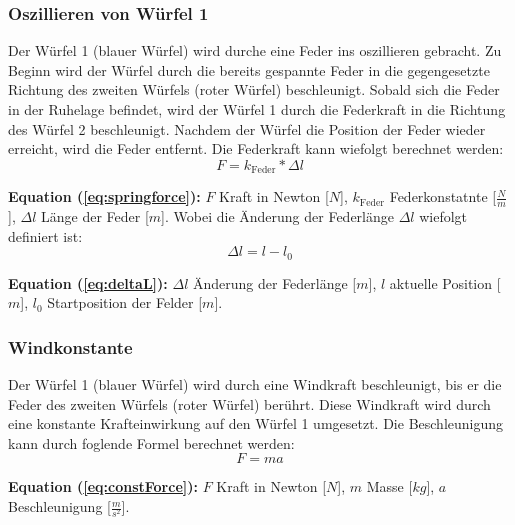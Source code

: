 \documentclass{article}
\begin{document}
\subsubsection{Oszillieren von Würfel 1}
Der Würfel 1 (blauer Würfel) wird durche eine Feder ins oszillieren gebracht. Zu Beginn wird der Würfel durch die bereits gespannte Feder in die gegengesetzte Richtung des zweiten Würfels (roter Würfel) beschleunigt. Sobald sich die Feder in der Ruhelage befindet, wird der Würfel 1 durch die Federkraft in die Richtung des Würfel 2 beschleunigt. Nachdem der Würfel die Position der Feder wieder erreicht, wird die Feder entfernt.
\newline
Die Federkraft kann wiefolgt berechnet werden:
\begin{equation}\label{eq:springforce}
    F =  k_{\text{Feder}} * \Delta l
\end{equation}

\scriptsize
\textbf{Equation (\ref{eq:springforce}):} $F$ Kraft in Newton [$N$], $k_{\text{Feder}}$ Federkonstatnte [$\frac{N}{m}$], $\Delta l$ Länge der Feder [$m$].
\normalsize
\medskip
\newline
Wobei die Änderung der Federlänge $\Delta l$ wiefolgt definiert ist:
\begin{equation}\label{eq:deltaL}
    \Delta l = l - l_0
\end{equation}

\scriptsize\textbf{Equation (\ref{eq:deltaL}):} $\Delta l$  Änderung der Federlänge [$m$], $l$ aktuelle Position [$m$], $l_0$ Startposition der Felder [$m$].
\newline
\normalsize
\medskip

\subsubsection{Windkonstante}
Der Würfel 1 (blauer Würfel) wird durch eine Windkraft beschleunigt, bis er die Feder des zweiten Würfels (roter Würfel) berührt.
Diese Windkraft wird durch eine konstante Krafteinwirkung auf den Würfel 1 umgesetzt.
\newline
Die Beschleunigung kann durch foglende Formel berechnet werden:
\begin{equation}\label{eq:constForce}
    F = m  a
\end{equation}

\scriptsize\textbf{Equation (\ref{eq:constForce}):} $F$ Kraft in Newton [$N$], $m$ Masse [$kg$], $a$ Beschleunigung 
[$\frac{m}{s^2}$].
\normalsize
\medskip
\end{document}
